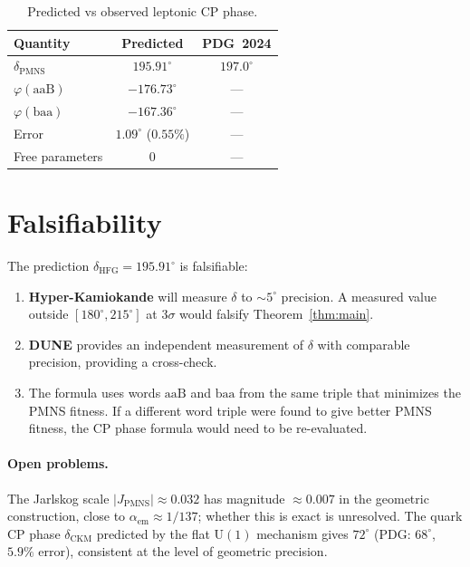\documentclass[11pt,a4paper]{article}
\theoremstyle{remark}
\begin{document}
\begin{table}[htbp]
\centering
\caption{Predicted vs observed leptonic CP phase.}
\label{tab:comparison}
\begin{tabular}{lcc}
\toprule
Quantity & Predicted & PDG~2024 \\
\midrule
$\delta_{\mathrm{PMNS}}$ & $195.91^\circ$ & $197.0^\circ$ \\
$\varphi(\mathrm{aaB})$ & $-176.73^\circ$ & --- \\
$\varphi(\mathrm{baa})$ & $-167.36^\circ$ & --- \\
Error & $1.09^\circ$ ($0.55\%$) & --- \\
Free parameters & 0 & --- \\
\bottomrule
\end{tabular}
\end{table}

\section{Falsifiability}
\label{sec:predictions}

The prediction $\delta_{\mathrm{HFG}}=195.91^\circ$ is falsifiable:
\begin{enumerate}
\item \textbf{Hyper-Kamiokande} will measure $\delta$ to
  $\sim5^\circ$ precision. A measured value outside
  $[180^\circ,215^\circ]$ at $3\sigma$ would falsify
  Theorem~\ref{thm:main}.
\item \textbf{DUNE} provides an independent measurement of $\delta$
  with comparable precision, providing a cross-check.
\item The formula uses words $\mathrm{aaB}$ and $\mathrm{baa}$ from
  the same triple that minimizes the PMNS fitness. If a different
  word triple were found to give better PMNS fitness, the CP phase
  formula would need to be re-evaluated.
\end{enumerate}

\paragraph{Open problems.}
The Jarlskog scale $|J_{\mathrm{PMNS}}|\approx0.032$ has magnitude
$\approx0.007$ in the geometric construction, close to
$\alpha_{\mathrm{em}}\approx1/137$; whether this is exact is
unresolved. The quark CP phase $\delta_{\mathrm{CKM}}$ predicted
by the flat $\mathrm{U}(1)$ mechanism gives $72^\circ$ (PDG:
$68^\circ$, $5.9\%$ error), consistent at the level of geometric
precision.
\end{document}
